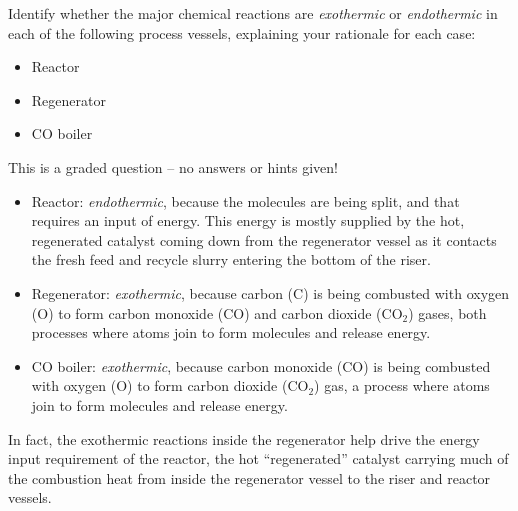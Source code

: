 \vskip 10pt

Identify whether the major chemical reactions are {\it exothermic} or {\it endothermic} in each of the following process vessels, explaining your rationale for each case:

\begin{itemize}
\item{} Reactor
\vskip 10pt
\item{} Regenerator
\vskip 10pt
\item{} CO boiler
\end{itemize}

\vfil

\eject






This is a graded question -- no answers or hints given!







\begin{itemize}
\item{} Reactor: {\it endothermic}, because the molecules are being split, and that requires an input of energy.  This energy is mostly supplied by the hot, regenerated catalyst coming down from the regenerator vessel as it contacts the fresh feed and recycle slurry entering the bottom of the riser.
\vskip 10pt
\item{} Regenerator: {\it exothermic}, because carbon (C) is being combusted with oxygen (O) to form carbon monoxide (CO) and carbon dioxide (CO$_{2}$) gases, both processes where atoms join to form molecules and release energy.
\vskip 10pt
\item{} CO boiler: {\it exothermic}, because carbon monoxide (CO) is being combusted with oxygen (O) to form carbon dioxide (CO$_{2}$) gas, a process where atoms join to form molecules and release energy.
\end{itemize}

In fact, the exothermic reactions inside the regenerator help drive the energy input requirement of the reactor, the hot ``regenerated'' catalyst carrying much of the combustion heat from inside the regenerator vessel to the riser and reactor vessels.




